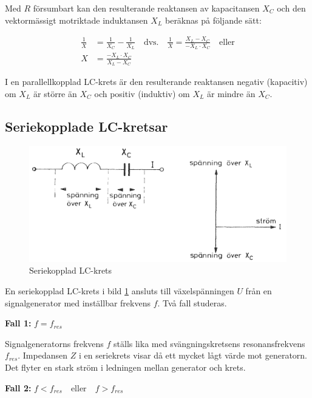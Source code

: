 Med \(R\) försumbart kan den resulterande reaktansen av kapacitansen \(X_C\)
och den vektormässigt motriktade induktansen \(X_L\) beräknas på följande sätt:

\begin{align*}
  \frac{1}{X} &= \frac{1}{X_C} - \frac{1}{X_L} \quad \text{dvs.} \quad
  \frac{1}{X} = \frac{X_L - X_C}{-X_L \cdot X_C} \quad \text{eller} \\
  X &= \frac{-X_L \cdot X_C}{X_L - X_C}
\end{align*}

I en parallellkopplad LC-krets är den resulterande reaktansen negativ
(kapacitiv) om \(X_L\) är större än \(X_C\) och positiv (induktiv) om \(X_L\) är
mindre än \(X_C\).

\subsection{Seriekopplade LC-kretsar}

\begin{figure}
\includegraphics[width=\textwidth]{images/cropped_pdfs/bild_2_3-16.pdf}
\caption{Seriekopplad LC-krets}
\label{fig:BildII3-16}
\end{figure}

En seriekopplad LC-krets i bild \ref{fig:BildII3-16} ansluts till
växelspänningen \(U\) från en signalgenerator med inställbar frekvens \(f\).
Två fall studeras.

\textbf{Fall 1:} \(f = f_{res}\)

Signalgeneratorns frekvens \(f\) ställs lika med svängningskretsens
resonansfrekvens \(f_{res}\).
Impedansen \(Z\) i en seriekrets visar då ett mycket lågt värde mot generatorn.
Det flyter en stark ström i ledningen mellan generator och krets.

\textbf{Fall 2:} \(f < f_{res} \quad \text{eller} \quad f > f_{res}\)


